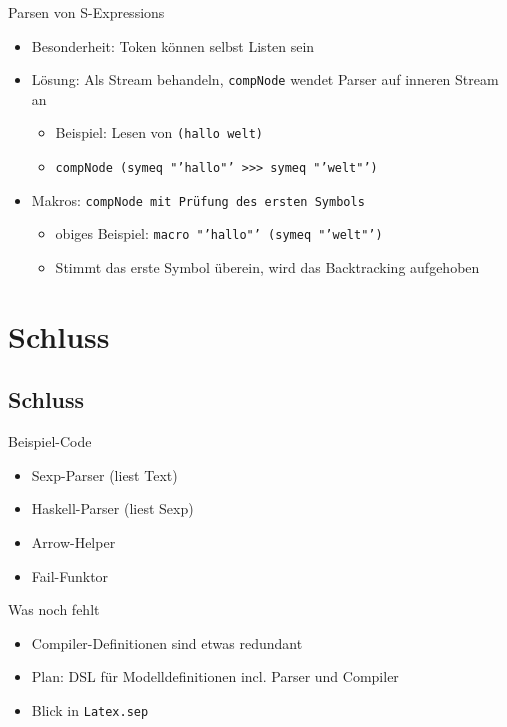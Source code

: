 \documentclass{beamer}
\begin{document}
\begin{frame}{Parsen von S-Expressions}
  \begin{itemize}
  \item Besonderheit: Token können selbst Listen sein
  \item Lösung: Als Stream behandeln, \texttt{compNode} wendet Parser
    auf inneren Stream an
    \begin{itemize}
    \item Beispiel: Lesen von \texttt{(hallo welt)}
    \item \texttt{compNode (symeq "'hallo"' >>> symeq "'welt"') } %
    \end{itemize}
  \item Makros: \texttt{compNode mit Prüfung des ersten Symbols}
    \begin{itemize}
    \item obiges Beispiel: \texttt{macro "'hallo"' (symeq "'welt"')}
    \item Stimmt das erste Symbol überein, wird das Backtracking aufgehoben
    \end{itemize}
  \end{itemize}
\end{frame}

\section{Schluss}
\subsection{Schluss}

\begin{frame}{Beispiel-Code}
  \begin{itemize}
  \item Sexp-Parser (liest Text)
  \item Haskell-Parser (liest Sexp)
  \item Arrow-Helper
  \item Fail-Funktor
  \end{itemize}
\end{frame}

\begin{frame}{Was noch fehlt}
  \begin{itemize}
  \item Compiler-Definitionen sind etwas redundant
  \item Plan: DSL für Modelldefinitionen incl. Parser und Compiler
  \item Blick in \texttt{Latex.sep}
  \end{itemize}
\end{frame}
\end{document}
